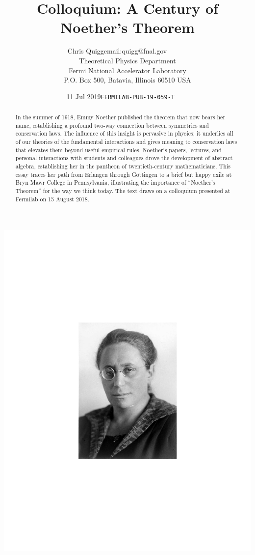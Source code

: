 \documentclass[twoside,symmetric]{tufte-handout}
\title{Colloquium: A Century of Noether's Theorem}%
\author[Chris Quigg]{Chris Quigg\hfill{\small email:quigg@fnal.gov~~~~~~}\\
{\normalsize Theoretical Physics Department\\ Fermi National Accelerator
Laboratory\\ P.O. Box 500, Batavia, Illinois 60510 USA}}
\date{{11 Jul 2019}\hfill {\texttt{\hbox{\small FERMILAB-PUB-19-059-T~~~~}}}} %
\begin{document}
\maketitle%
\begin{marginfigure}[112pt]
\centering
\includegraphics[width=0.75\columnwidth]{EmmyFigs/Emmy_NoetherBMarchiveC2algray}
\end{marginfigure}
\begin{abstract}
\noindent
In the summer of 1918, Emmy Noether published the theorem that now bears her name, establishing a profound two-way connection between symmetries and conservation laws. The influence of this insight is pervasive in physics; it underlies all of our theories of the fundamental interactions and gives meaning to conservation laws that elevates them beyond useful empirical rules. Noether's papers, lectures, and personal interactions with students and colleagues drove the development of abstract algebra, establishing her in the pantheon of twentieth-century mathematicians. This essay traces her path from Erlangen through G\"ottingen to a brief but happy exile at Bryn Mawr College in Pennsylvania, illustrating the importance of ``Noether's Theorem'' for the way we think today. The text draws on a colloquium presented at Fermilab on 15 August 2018.
\end{abstract}
\end{document}
